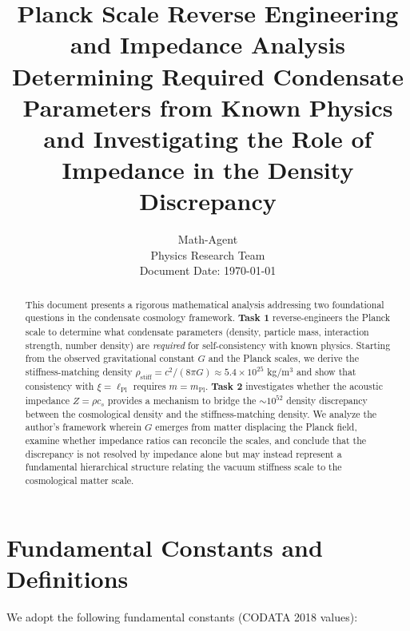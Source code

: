 \documentclass[11pt,a4paper]{article}
\title{\textbf{Planck Scale Reverse Engineering and Impedance Analysis}\\[0.5em]
\large Determining Required Condensate Parameters from Known Physics\\[0.3em]
and Investigating the Role of Impedance in the Density Discrepancy}
\author{Math-Agent\\
\small Physics Research Team\\
\small Document Date: \today}
\date{}
\newcommand{\lPl}{\ensuremath{\ell_{\mathrm{Pl}}}}
\newcommand{\mPl}{\ensuremath{m_{\mathrm{Pl}}}}
\newcommand{\rhostiff}{\ensuremath{\rho_{\mathrm{stiff}}}}
\theoremstyle{definition}
\begin{document}
\maketitle

\begin{abstract}
This document presents a rigorous mathematical analysis addressing two foundational questions in the condensate cosmology framework. \textbf{Task 1} reverse-engineers the Planck scale to determine what condensate parameters (density, particle mass, interaction strength, number density) are \emph{required} for self-consistency with known physics. Starting from the observed gravitational constant $G$ and the Planck scales, we derive the stiffness-matching density $\rhostiff = c^2/(8\pi G) \approx 5.4 \times 10^{25}$ kg/m$^3$ and show that consistency with $\xi = \lPl$ requires $m = \mPl$. \textbf{Task 2} investigates whether the acoustic impedance $Z = \rho c_s$ provides a mechanism to bridge the $\sim 10^{52}$ density discrepancy between the cosmological density and the stiffness-matching density. We analyze the author's framework wherein $G$ emerges from matter displacing the Planck field, examine whether impedance ratios can reconcile the scales, and conclude that the discrepancy is not resolved by impedance alone but may instead represent a fundamental hierarchical structure relating the vacuum stiffness scale to the cosmological matter scale.
\end{abstract}

\tableofcontents
\newpage

\section{Fundamental Constants and Definitions}
\label{sec:constants}

We adopt the following fundamental constants (CODATA 2018 values):
\end{document}

